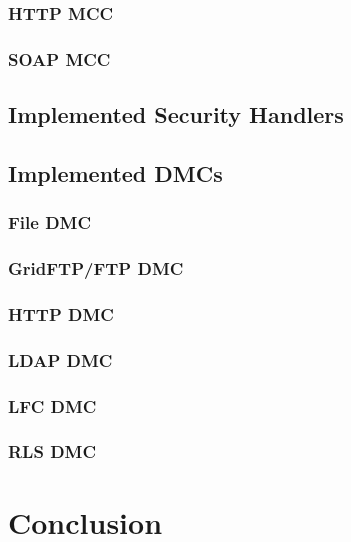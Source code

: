 \documentclass{book}
\begin{document}



\subsection{HTTP MCC}


\subsection{SOAP MCC}


\section{Implemented Security Handlers}


\section{Implemented DMCs}


\subsection{File DMC}


\subsection{GridFTP/FTP DMC}


\subsection{HTTP DMC}


\subsection{LDAP DMC}


\subsection{LFC DMC}


\subsection{RLS DMC}


\chapter{Conclusion}


\end{document}
